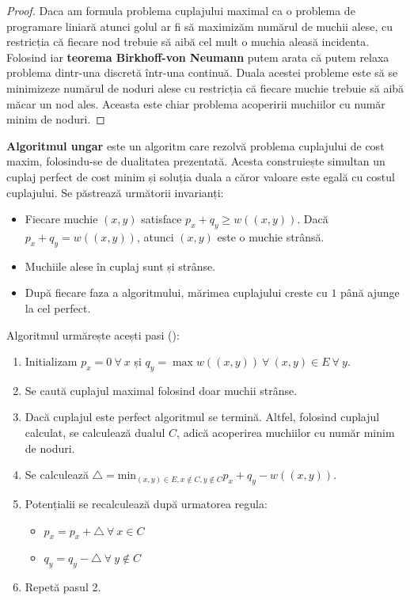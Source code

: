 \begin{proof}
  Daca am formula problema cuplajului maximal ca o problema de programare liniară atunci golul ar fi să maximizăm numărul de muchii alese,
  cu restricția că fiecare nod trebuie să aibă cel mult o muchia aleasă incidenta. Folosind iar \textbf{teorema Birkhoff-von Neumann} putem
  arata că putem relaxa problema dintr-una discretă într-una continuă. Duala acestei probleme este să se minimizeze numărul de noduri alese
  cu restricția că fiecare muchie trebuie să aibă măcar un nod ales. Aceasta este chiar problema acoperirii muchiilor cu număr minim de noduri.
\end{proof}

\textbf{Algoritmul ungar} este un algoritm care rezolvă problema cuplajului de cost maxim, folosindu-se de dualitatea prezentată. Acesta
construiește simultan un cuplaj perfect de cost minim și soluția duala a căror valoare este egală cu costul cuplajului. Se păstrează
următorii invarianți:

\begin{itemize}
  \item Fiecare muchie $(x, y)$ satisface $p_{x} + q_{y} \geq w((x, y))$. Dacă $p_{x} + q_{y} = w((x, y))$, atunci $(x, y)$ este o muchie strânsă.
  \item Muchiile alese în cuplaj sunt și strânse.
  \item După fiecare faza a algoritmului, mărimea cuplajului creste cu $1$ până ajunge la cel perfect.
\end{itemize}

\noindent Algoritmul urmărește acești pasi (\cite{hungarian}):

\begin{enumerate}
  \item Initializam $p_{x} = 0 \ \forall \ x$ și $q_{y} = \max w((x, y)) \ \forall \ (x, y) \in E \ \forall \ y$.
  \item Se caută cuplajul maximal folosind doar muchii strânse.
  \item Dacă cuplajul este perfect algoritmul se termină. Altfel, folosind cuplajul calculat, se calculează dualul $C$,
    adică acoperirea muchiilor cu număr minim de noduri.
  \item Se calculează $\bigtriangleup = \text{min}_{(x, y) \in E, x \notin C, y \notin C} p_{x} + q_{y} - w((x, y))$.
  \item Potențialii se recalculează după urmatorea regula:
    \begin{itemize}
      \item $p_{x} = p_{x} + \bigtriangleup \ \forall \ x \in C$
      \item $q_{y} = q_{y} - \bigtriangleup \ \forall \ y \notin C$
    \end{itemize}
  \item Repetă pasul 2.
\end{enumerate}

